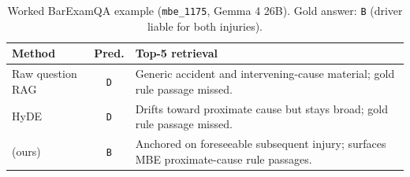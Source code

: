 \begin{table}[!htbp]
\centering
\caption{Worked BarExamQA example (\texttt{mbe\_1175}, Gemma 4 26B). Gold
answer: \texttt{B} (driver liable for both injuries).}
\label{tab:worked_examples}
\footnotesize
\begin{tabularx}{\columnwidth}{lcY}
\toprule
Method & Pred. & Top-5 retrieval \\
\midrule
Raw question RAG & \texttt{D} 
& Generic accident and intervening-cause material; gold rule passage missed. \\
\addlinespace
HyDE & \texttt{D} 
& Drifts toward proximate cause but stays broad; gold rule passage missed. \\
\addlinespace
\hyre{} (ours) & \texttt{B} 
& Anchored on foreseeable subsequent injury; surfaces MBE proximate-cause rule passages. \\
\bottomrule
\end{tabularx}
\end{table}
